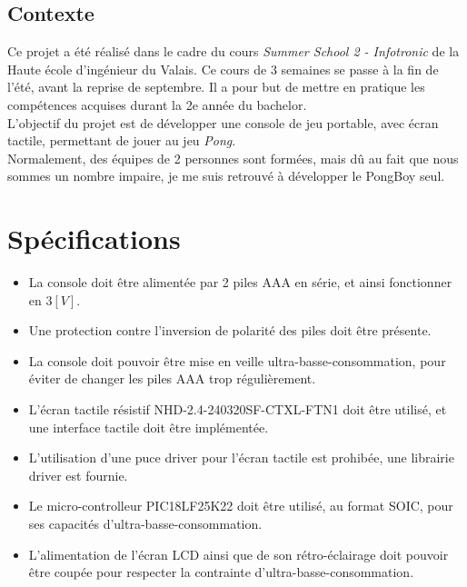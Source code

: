 \begin{summary}
\section{Contexte}
Ce projet a été réalisé dans le cadre du cours
\emph{Summer School 2 - Infotronic} de la Haute école d'ingénieur du Valais.
Ce cours de 3 semaines se passe à la fin de l'été, avant la reprise de
septembre. Il a pour but de mettre en pratique les compétences acquises
durant la 2e année du bachelor.\\
L'objectif du projet est de développer une console de jeu portable,
avec écran tactile, permettant de jouer au jeu \emph{Pong}.\\
Normalement, des équipes de 2 personnes sont formées, mais
dû au fait que nous sommes un nombre impaire, je me suis retrouvé à développer
le PongBoy seul.
\end{summary}

\section{Spécifications}
\begin{itemize}
  \item La console doit être alimentée par 2 piles AAA en série, et ainsi
  fonctionner en $3[V]$.
  \item Une protection contre l'inversion de polarité des piles doit être
  présente.
  \item La console doit pouvoir être mise en veille ultra-basse-consommation,
  pour éviter de changer les piles AAA trop régulièrement.
  \item L'écran tactile résistif NHD-2.4-240320SF-CTXL-FTN1 doit être utilisé,
  et une interface tactile doit être implémentée.
  \item L'utilisation d'une puce driver pour l'écran tactile est prohibée,
  une librairie driver est fournie.
  \item Le micro-controlleur PIC18LF25K22 doit être utilisé, au format SOIC,
  pour ses capacités d'ultra-basse-consommation.
  \item L'alimentation de l'écran LCD ainsi que de son rétro-éclairage doit
  pouvoir être coupée pour respecter la contrainte d'ultra-basse-consommation.
\end{itemize}
